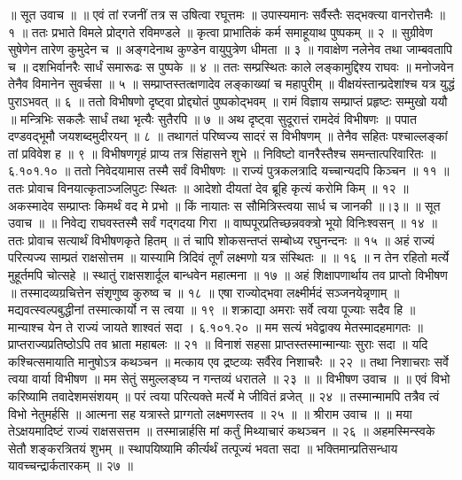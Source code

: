 ॥ सूत उवाच ॥ ॥
एवं तां रजनीं तत्र स उषित्वा रघूत्तमः ॥
उपास्यमानः सर्वैस्तैः सद्भक्त्या वानरोत्तमैः ॥ १ ॥
ततः प्रभाते विमले प्रोद्गते रविमण्डले ॥
कृत्वा प्राभातिकं कर्म समाहूयाथ पुष्पकम् ॥ २ ॥
सुग्रीवेण सुषेणेन तारेण कुमुदेन च ॥
अङ्गदेनाथ कुण्डेन वायुपुत्रेण धीमता ॥ ३ ॥
गवाक्षेण नलेनेव तथा जाम्बवतापि च ॥
दशभिर्वानरैः सार्धं समारूढः स पुष्पके ॥ ४ ॥
ततः सम्प्रस्थितः काले लङ्कामुद्दिश्य राघवः ॥
मनोजवेन तेनैव विमानेन सुवर्चसा ॥ ५ ॥
सम्प्राप्तस्तत्क्षणादेव लङ्काख्यां च महापुरीम् ॥
वीक्षयंस्तान्प्रदेशांश्च यत्र युद्धं पुराऽभवत् ॥ ६ ॥
ततो विभीषणो दृष्ट्वा प्रोद्द्योतं पुष्पकोद्भवम् ॥
रामं विज्ञाय सम्प्राप्तं प्रहृष्टः सम्मुखो ययौ ॥
मन्त्रिभिः सकलैः सार्धं तथा भृत्यैः सुतैरपि ॥ ७ ॥
अथ दृष्ट्वा सुदूरात्तं रामदेवं विभीषणः ॥
पपात दण्डवद्भूमौ जयशब्दमुदीरयन् ॥ ८ ॥
तथागतं परिष्वज्य सादरं स विभीषणम् ॥
तेनैव सहितः पश्चाल्लङ्कां तां प्रविवेश ह ॥ ९ ॥
विभीषणगृहं प्राप्य तत्र सिंहासने शुभे ॥
निविष्टो वानरैस्तैश्च समन्तात्परिवारितः ॥ ६.१०१.१० ॥
ततो निवेदयामास तस्मै सर्वं विभीषणः ॥
राज्यं पुत्रकलत्रादि यच्चान्यदपि किञ्चन ॥ ११ ॥
ततः प्रोवाच विनयात्कृताञ्जलिपुटः स्थितः ॥
आदेशो दीयतां देव ब्रूहि कृत्यं करोमि किम् ॥ १२ ॥
अकस्मादेव सम्प्राप्तः किमर्थं वद मे प्रभो ॥
किं नायातः स सौमित्रिस्त्वया सार्ध च जानकी ॥।३॥
॥ सूत उवाच ॥ ॥
निवेद्य राघवस्तस्मै सर्वं गद्गदया गिरा ॥
वाष्पपूरप्रतिच्छन्नवक्त्रो भूयो विनिःश्वसन् ॥ १४ ॥
ततः प्रोवाच सत्यार्थं विभीषणकृते हितम् ॥
तं चापि शोकसन्तप्तं सम्बोध्य रघुनन्दनः ॥ १५ ॥
अहं राज्यं परित्यज्य साम्प्रतं राक्षसोत्तम ॥
यास्यामि त्रिदिवं तूर्णं लक्ष्मणो यत्र संस्थितः ॥ ॥ १६ ॥
न तेन रहितो मर्त्ये मुहूर्तमपि चोत्सहे ॥
स्थातुं राक्षसशार्दूल बान्धवेन महात्मना ॥ १७ ॥
अहं शिक्षापणार्थाय तव प्राप्तो विभीषण ॥
तस्मादव्यग्रचित्तेन संशृणुष्व कुरुष्व च ॥ १८ ॥
एषा राज्योद्भवा लक्ष्मीर्मदं सञ्जनयेन्नृणाम् ॥
मद्यवत्स्वल्पबुद्धीनां तस्मात्कार्यो न स त्वया ॥ १९ ॥
शक्राद्या अमराः सर्वे त्वया पूज्याः सदैव हि ॥
मान्याश्च येन ते राज्यं जायते शाश्वतं सदा । ६.१०१.२० ॥
मम सत्यं भवेद्वाक्य मेतस्मादहमागतः ॥
प्राप्तराज्यप्रतिष्ठोऽपि तव भ्राता महाबलः ॥ २१ ॥
विनाशं सहसा प्राप्तस्तस्मान्मान्याः सुराः सदा ॥
यदि कश्चित्समायाति मानुषोऽत्र कथञ्चन ॥
मत्काय एव द्रष्टव्यः सर्वैरेव निशाचरैः ॥ २२ ॥
तथा निशाचराः सर्वे त्वया वार्या विभीषण ॥
मम सेतुं समुल्लङ्घ्य न गन्तव्यं धरातले ॥ २३ ॥
॥ विभीषण उवाच ॥ ॥
एवं विभो करिष्यामि तवादेशमसंशयम् ॥
परं त्वया परित्यक्ते मर्त्ये मे जीवितं व्रजेत् ॥ २४ ॥
तस्मान्मामपि तत्रैव त्वं विभो नेतुमर्हसि ॥
आत्मना सह यत्रास्ते प्राग्गतो लक्ष्मणस्तव ॥ २५ ॥
॥ श्रीराम उवाच ॥ ॥
मया तेऽक्षयमादिष्टं राज्यं राक्षससत्तम ॥
तस्मान्नार्हसि मां कर्तुं मिथ्याचारं कथञ्चन ॥ २६ ॥
अहमस्मिन्स्वके सेतौ शङ्करत्रितयं शुभम् ॥
स्थापयिष्यामि कीर्त्यर्थं तत्पूज्यं भवता सदा ॥
भक्तिमान्प्रतिसन्धाय यावच्चन्द्रार्कतारकम् ॥ २७ ॥
